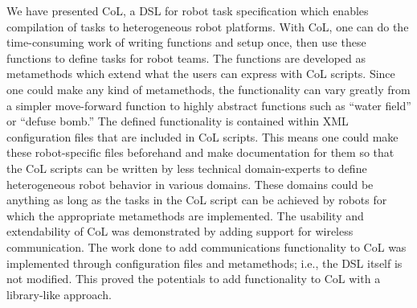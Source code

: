 \documentclass[runningheads]{llncs}
\begin{document}
We have presented CoL, a DSL for robot task specification which enables compilation of tasks to heterogeneous robot platforms.
With CoL, one can do the time-consuming work of writing functions and setup once, then use these functions to define tasks for robot teams. 
The functions are developed as metamethods which extend what the users can express with CoL scripts. 
Since one could make any kind of metamethods, the functionality can vary greatly from a simpler move-forward function to highly abstract functions such as ``water field'' or ``defuse bomb.'' 
The defined functionality is contained within XML configuration files that are included in CoL scripts. 
This means one could make these robot-specific files beforehand and make documentation for them so that the CoL scripts can be written by less technical domain-experts to define heterogeneous robot behavior in various domains.
These domains could be anything as long as the tasks in the CoL script can be achieved by robots for which the appropriate metamethods are implemented.
The usability and extendability of CoL was demonstrated by adding support for wireless communication.
The work done to add communications functionality to CoL was implemented through configuration files and metamethods; i.e., the DSL itself is not modified. 
This proved the potentials to add functionality to CoL with a library-like approach.
\end{document}
